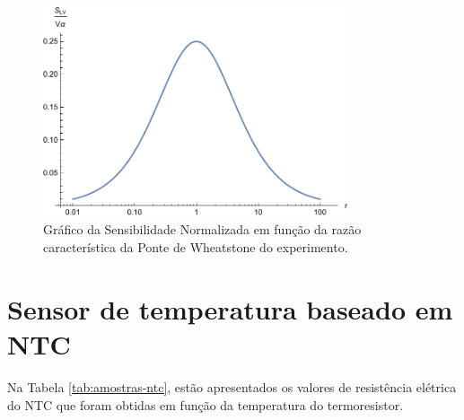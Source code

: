 \documentclass[a4paper]{instrumentacao}
\begin{document}
\begin{figure}[H]
\center
\includegraphics[width=0.8\textwidth]{NormalizedSensibility.pdf}
\caption{Gráfico da Sensibilidade Normalizada em função da razão característica da Ponte de Wheatstone do experimento.}
\label{fig:sensibilidade-normalizada}
\end{figure}

\section{Sensor de temperatura baseado em NTC}

Na Tabela \ref{tab:amostras-ntc}, estão apresentados os valores de resistência elétrica do NTC que foram obtidas em função da temperatura do termoresistor.
\end{document}
